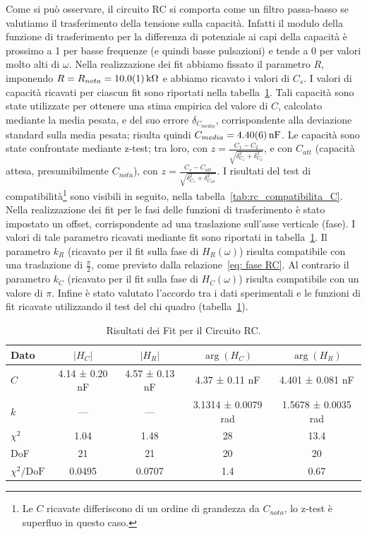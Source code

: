 \documentclass[a4paper]{article}
\begin{document}
Come si può osservare, il circuito RC si comporta come un filtro passa-basso se valutiamo il trasferimento della tensione sulla capacità.
Infatti il modulo della funzione di trasferimento per la differenza di potenziale ai capi della capacità è prossimo a 1 per basse frequenze (e quindi basse pulsazioni) e tende a 0 per valori molto alti di $\omega$.
Nella realizzazione dei fit abbiamo fissato il parametro $R$, imponendo $R = R_{nota} = \SI{10.0 \pm 0.1}{k\ohm}$ e abbiamo ricavato i valori di $C_s$.
I valori di capacità ricavati per ciascun fit sono riportati nella tabella~\ref{tab:risultati_fit_rc}.
Tali capacità sono state utilizzate per ottenere una stima empirica del valore di $C$, calcolato mediante la media pesata, e del suo errore $\delta_{C_{media}}$, corrispondente alla deviazione standard sulla media pesata; risulta quindi $C_{media} = \SI{4.40 \pm 0.06}{nF}$.
Le capacità sono state confrontate mediante z-test; tra loro, con $z = \frac{C_1 - C_2}{\sqrt{\delta_{C_1}^2 + \delta_{C_2}^2}}$, e con $C_{att}$ (capacità attesa, presumibilmente $C_{nota}$), con $z = \frac{C_s - C_{att}}{\sqrt{\delta_{C_s}^2 + \delta_{C_{att}}^2}}$. I risultati del test di compatibilità\footnote{Le $C$ ricavate differiscono di un ordine di grandezza da $C_{nota}$, lo z-test è superfluo in questo caso.} sono visibili in seguito, nella tabella~\ref{tab:rc_compatibilita_C}.
Nella realizzazione dei fit per le fasi delle funzioni di trasferimento è stato impostato un offset, corrispondente ad una traslazione sull'asse verticale (fase). I valori di tale parametro ricavati mediante fit sono riportati in tabella~\ref{tab:risultati_fit_rc}. Il parametro $k_R$ (ricavato per il fit sulla fase di $H_R(\omega)$) risulta compatibile con una traslazione di $\frac{\pi}{2}$, come previsto dalla relazione~\eqref{eq: fase RC}. Al contrario il parametro $k_C$ (ricavato per il fit sulla fase di $H_C(\omega)$) risulta compatibile con un valore di $\pi$.
Infine è stato valutato l'accordo tra i dati sperimentali e le funzioni di fit ricavate utilizzando il test del chi quadro (tabella~\ref{tab:risultati_fit_rc}).
\begin{table}[htbp]
    \centering
    \begin{tabular}{|l|cccc|}
    \hline
    Dato & $|H_C|$ & $|H_R|$ & $\arg(H_C)$ & $\arg(H_R)$ \\\hline\hline
    $C$ & 4.14 ± 0.20 nF & 4.57 ± 0.13 nF & 4.37 ± 0.11 nF & 4.401 ± 0.081 nF \\\hline
    $k$ & --- & --- & 3.1314 ± 0.0079 rad & 1.5678 ± 0.0035 rad \\\hline
    $\chi^2$ & 1.04 & 1.48 & 28 & 13.4 \\\hline
    DoF & 21 & 21 & 20 & 20 \\\hline
    $\chi^2/\text{DoF}$ & 0.0495 & 0.0707 & 1.4 & 0.67 \\\hline
    \end{tabular}
    \caption{Risultati dei Fit per il Circuito RC.}
    \label{tab:risultati_fit_rc}
\end{table}
\end{document}
